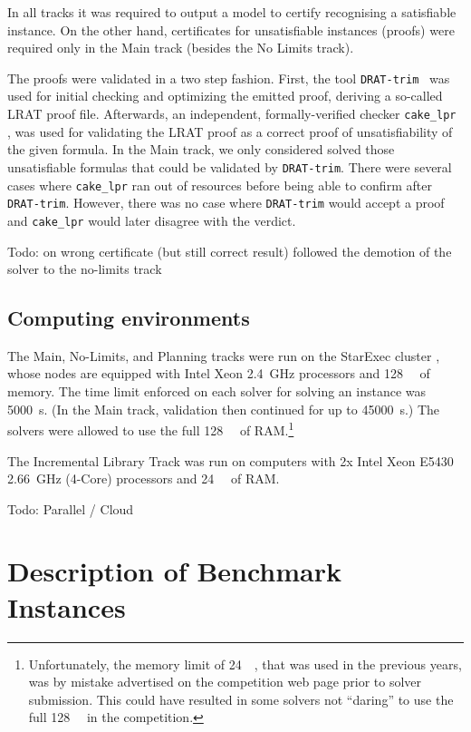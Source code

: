\documentclass{elsarticle}
\newcommand{\todo}[1]{{\color{purple}Todo: #1}}
\begin{document}
\label{sec:certif}

In all tracks it was required to output a model to certify recognising a satisfiable instance.
On the other hand, certificates for unsatisfiable instances (proofs) were required only 
in the Main track (besides the No Limits track).

The proofs were validated in a two step fashion. First, the tool {\tt DRAT-trim}~\cite{DRATtrim}
was used for initial checking and optimizing the emitted proof, deriving a so-called LRAT proof file.
Afterwards, an independent, formally-verified checker {\tt cake\_lpr} \cite{cakeLprGithub}, 
was used for validating the LRAT proof as a correct proof of unsatisfiability of the given formula.
In the Main track, we only considered solved those unsatisfiable formulas that 
could be validated by {\tt DRAT-trim}.
There were several cases where {\tt cake\_lpr} ran out of resources before being able to 
confirm after {\tt DRAT-trim}. However, there was no case where {\tt DRAT-trim} would accept
a proof and {\tt cake\_lpr} would later disagree with the verdict.

\todo{on wrong certificate (but still correct result) followed the demotion of the solver to the no-limits track}

\subsection{Computing environments}

\label{sec:computing}
The Main, No-Limits, and Planning tracks were run on the StarExec cluster \cite{starexec},
whose nodes are equipped with Intel Xeon \SI{2.4}{\giga\hertz} processors 
and \SI{128}{\giga\byte} of memory.
The time limit enforced on each solver for solving an instance was \SI{5000}{\second}. 
(In the Main track, validation then continued for up to \SI{45000}{\second}.)
The solvers were allowed to use the full \SI{128}{\giga\byte} of RAM.\footnote{
Unfortunately, the memory limit of \SI{24}{\giga\byte}, that was used in the previous years,
was by mistake advertised on the competition web page prior to solver submission.
This could have resulted in some solvers not ``daring'' to use the full \SI{128}{\giga\byte}
in the competition.}

The Incremental Library Track was run on computers with 2x Intel Xeon E5430 \SI{2.66}{\giga\hertz}
(4-Core) processors and \SI{24}{\giga\byte} of RAM.

\todo{Parallel / Cloud}

\section{Description of Benchmark Instances}
\label{sec:instances}
\end{document}
